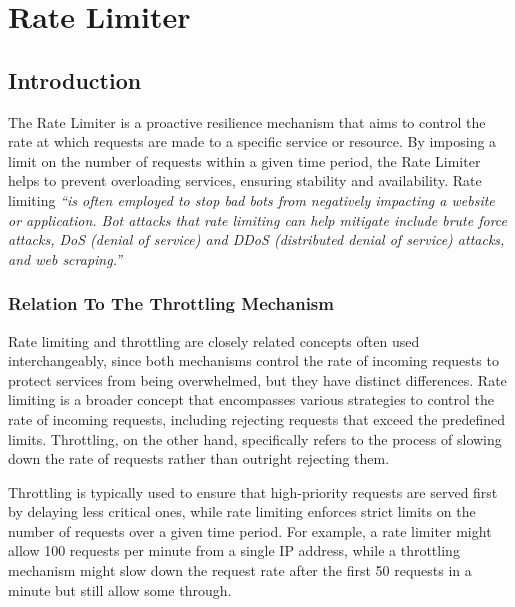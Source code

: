 \chapter{Rate Limiter}\label{ch:rate-limiter}



\section{Introduction}\label{sec:rate-limiter-introduction}

The Rate Limiter is a proactive resilience mechanism
that aims to control the rate at which requests are made to a specific service or resource.
By imposing a limit on the number of requests within a given time period,
the Rate Limiter helps to prevent overloading services,
ensuring stability and availability.
Rate limiting \textit{\enquote{is often employed to stop bad bots from negatively impacting a website or application.
Bot attacks that rate limiting can help mitigate include brute force attacks, DoS (denial of service)
    and DDoS (distributed denial of service) attacks, and web scraping.}}~\cite{cloudflare-rate-limiting}

\subsection{Relation To The Throttling Mechanism}\label{subsec:rate-limiter-throttling}

Rate limiting and throttling are closely related concepts often used interchangeably,
since both mechanisms control the rate of incoming requests to protect services from being overwhelmed, but they have distinct differences.
Rate limiting is a broader concept that encompasses various strategies to control the rate of incoming requests, including rejecting requests that exceed the predefined limits.
Throttling, on the other hand, specifically refers to the process of slowing down the rate of requests rather than outright rejecting them.

Throttling is typically used to ensure that high-priority requests are served first by delaying less critical ones,
while rate limiting enforces strict limits on the number of requests over a given time period.
For example, a rate limiter might allow 100 requests per minute from a single IP address, while a throttling mechanism might slow down the request rate after the first 50 requests in a minute but still allow some through.

